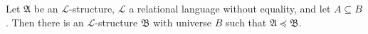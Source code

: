 Let $\mathfrak{A}$ be an $\mathcal{L}$-structure, $\mathcal{L}$ a relational language without equality, and let $A \subseteq B$. Then there is an $\mathcal{L}$-structure $\mathfrak{B}$ with universe $B$ such that $\mathfrak{A} \preceq \mathfrak{B}$.

